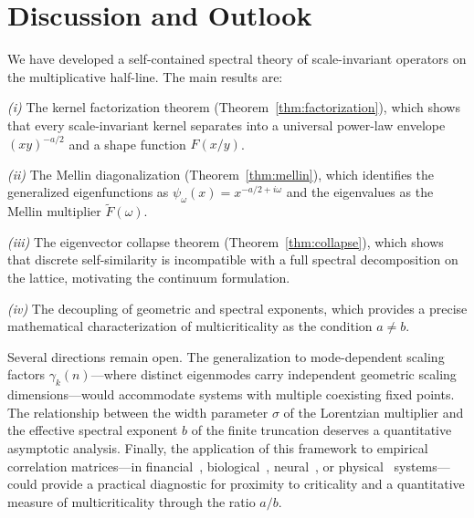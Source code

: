 \documentclass[12pt]{article}
\begin{document}
\section{Discussion and Outlook}\label{sec:conclusion}

We have developed a self-contained spectral theory of scale-invariant operators on the multiplicative half-line. The main results are:

\emph{(i)} The kernel factorization theorem (Theorem~\ref{thm:factorization}), which shows that every scale-invariant kernel separates into a universal power-law envelope $(xy)^{-a/2}$ and a shape function $F(x/y)$.

\emph{(ii)} The Mellin diagonalization (Theorem~\ref{thm:mellin}), which identifies the generalized eigenfunctions as $\psi_\omega(x) = x^{-a/2+i\omega}$ and the eigenvalues as the Mellin multiplier $\widetilde{F}(\omega)$.

\emph{(iii)} The eigenvector collapse theorem (Theorem~\ref{thm:collapse}), which shows that discrete self-similarity is incompatible with a full spectral decomposition on the lattice, motivating the continuum formulation.

\emph{(iv)} The decoupling of geometric and spectral exponents, which provides a precise mathematical characterization of multicriticality as the condition $a \neq b$.

Several directions remain open. The generalization to mode-dependent scaling factors $\gamma_k(n)$---where distinct eigenmodes carry independent geometric scaling dimensions---would accommodate systems with multiple coexisting fixed points. The relationship between the width parameter $\sigma$ of the Lorentzian multiplier and the effective spectral exponent $b$ of the finite truncation deserves a quantitative asymptotic analysis. Finally, the application of this framework to empirical correlation matrices---in financial~\cite{Plerou1999,Laloux1999}, biological~\cite{MoraBialek2011,Tkacik2015}, neural~\cite{Cavagna2010}, or physical~\cite{msi2026} systems---could provide a practical diagnostic for proximity to criticality and a quantitative measure of multicriticality through the ratio $a/b$.
\end{document}
